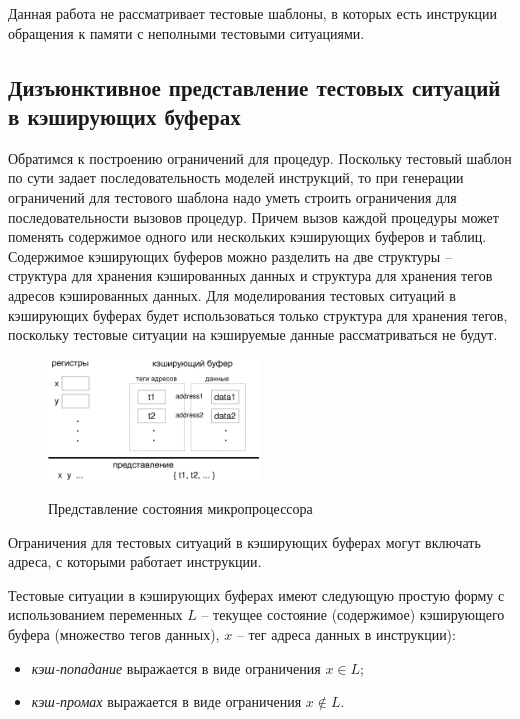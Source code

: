 Данная работа не рассматривает тестовые шаблоны, в которых есть
инструкции обращения к памяти с неполными тестовыми ситуациями.

\subsection{Дизъюнктивное представление тестовых ситуаций в
кэширующих буферах}

Обратимся к построению ограничений для процедур. Поскольку тестовый
шаблон по сути задает последовательность моделей инструкций, то при
генерации ограничений для тестового шаблона надо уметь строить
ограничения для последовательности вызовов процедур. Причем вызов
каждой процедуры может поменять содержимое одного или нескольких
кэширующих буферов и таблиц. Содержимое кэширующих буферов можно
разделить на две структуры -- структура для хранения кэшированных
данных и структура для хранения тегов адресов кэшированных данных.
Для моделирования тестовых ситуаций в кэширующих буферах будет
использоваться только структура для хранения тегов, поскольку
тестовые ситуации на кэшируемые данные рассматриваться не будут.

\begin{figure}[h] \center
  \includegraphics[width=0.5\textwidth]{2.theor/mpset}\\
  \caption{Представление состояния микропроцессора}\label{mpset}
\end{figure}

Ограничения для тестовых ситуаций в кэширующих буферах могут
включать адреса, с которыми работает инструкции.

\begin{utv}\label{hit_miss_simpleform}
Тестовые ситуации в кэширующих буферах имеют следующую простую форму
с использованием переменных $L$ -- текущее состояние (содержимое)
кэширующего буфера (множество тегов данных), $x$ -- тег адреса
данных в инструкции):
\begin{itemize}
\item \emph{кэш-попадание} выражается в виде ограничения $x \in L$;
\item \emph{кэш-промах} выражается в виде ограничения $x \notin L$.
\end{itemize}
\end{utv}


